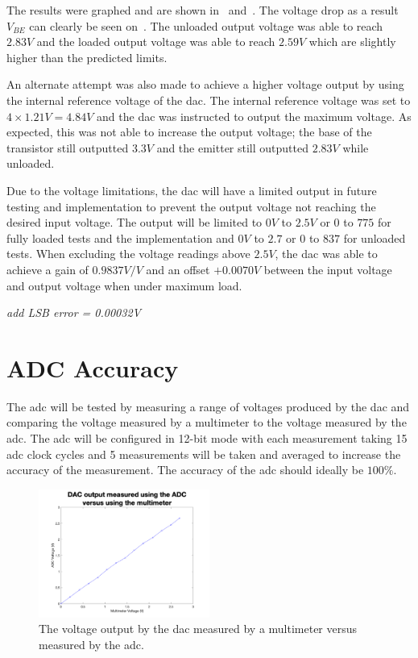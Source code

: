 The results were graphed and are shown in~ and~.
The voltage drop as a result $V_{BE}$ can clearly be seen on~.
The unloaded output voltage was able to reach $2.83V$ and the loaded output voltage was able to reach $2.59V$ which are slightly higher than the predicted limits.

An alternate attempt was also made to achieve a higher voltage output by using the internal reference voltage of the \gls{dac}.
The internal reference voltage was set to $4 \times 1.21V = 4.84V$ and the \gls{dac} was instructed to output the maximum voltage.
As expected, this was not able to increase the output voltage; the base of the transistor still outputted $3.3V$ and the emitter still outputted $2.83V$ while unloaded.

Due to the voltage limitations, the \gls{dac} will have a limited output in future testing and implementation to prevent the output voltage not reaching the desired input voltage.
The output will be limited to $0V$ to $2.5V$ or $0$ to $775$ for fully loaded tests and the implementation and $0V$ to $2.7$ or $0$ to $837$ for unloaded tests.
When excluding the voltage readings above $2.5V$, the \gls{dac} was able to achieve a gain of $0.9837V/V$ and an offset $+0.0070V$ between the input voltage and output voltage when under maximum load. 

\textit{add LSB error = 0.00032V}

\section{ADC Accuracy}\label{sec:adc-accuracy}

The \gls{adc} will be tested by measuring a range of voltages produced by the \gls{dac} and comparing the voltage measured by a multimeter to the voltage measured by the \gls{adc}.
The \gls{adc} will be configured in 12-bit mode with each measurement taking 15 \gls{adc} clock cycles and 5 measurements will be taken and averaged to increase the accuracy of the measurement.
The accuracy of the \gls{adc} should ideally be $100\%$.

\begin{figure}[!h]
    \centering
    \includegraphics[width=0.5\textwidth]{Figures/Testing/ADC}
    \caption{The voltage output by the \gls{dac} measured by a multimeter versus measured by the \gls{adc}.}
    \label{fig:adc-accuracy} %
\end{figure}

